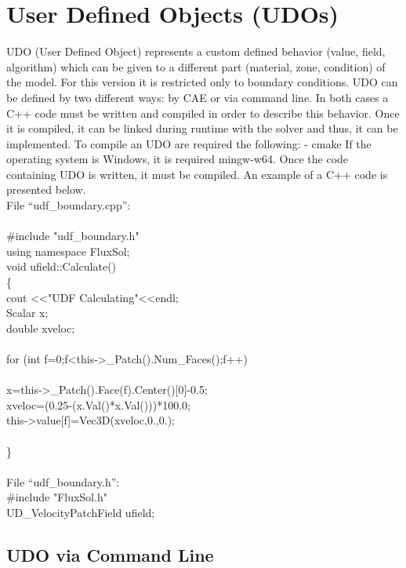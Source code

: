 \documentclass{article}     %
\begin{document}
\section{User Defined Objects (UDOs)}
UDO (User Defined Object) represents a custom defined  behavior (value, field, algorithm) which can be given to a different part (material, zone, condition) of the model. For this version it is restricted only to boundary conditions. UDO can be defined by two different ways: by CAE or via command line. In both cases a C++ code must be written and compiled in order to describe this behavior. Once it is compiled, it can be linked during runtime with the solver and thus, it can be implemented. 
To compile an UDO are required the following:
- cmake
If the operating system is Windows, it is required mingw-w64.
Once the code containing UDO is written, it must be compiled. 
An example of a C++ code is presented below. \\
File “udf\_boundary.cpp”:\\
\\
\#include "udf\_boundary.h"\\
using namespace FluxSol;\\
void ufield::Calculate()\\
\{
\\
    cout \textless\textless "UDF Calculating"\textless\textless endl;\\
	Scalar x;\\
	double xveloc;\\
\\
	for (int f=0;f<this-\textgreater\_Patch().Num\_Faces();f++)\\
	\\
		x=this-\textgreater\_Patch().Face(f).Center()[0]-0.5;\\
		xveloc=(0.25-(x.Val()*x.Val()))*100.0;\\
		this-\textgreater value[f]=Vec3D(xveloc,0.,0.);\\
	\\
\}\\ \\
File “udf\_boundary.h”:\\
\#include "FluxSol.h"\\
UD\_VelocityPatchField ufield;\\
\subsection{UDO via Command Line}
\end{document}
